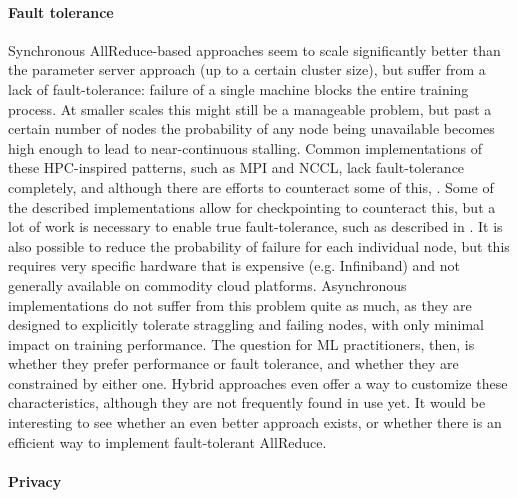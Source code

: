 \paragraph{Fault tolerance}

Synchronous AllReduce-based approaches seem to scale significantly better than the parameter server approach (up to a certain cluster size), but suffer from a lack of fault-tolerance: failure of a single machine blocks the entire training process. At smaller scales this might still be a manageable problem, but past a certain number of nodes the probability of any node being unavailable becomes high enough to lead to near-continuous stalling. Common implementations of these HPC-inspired patterns, such as MPI and NCCL, lack fault-tolerance completely, and although there are efforts to counteract some of this, . Some of the described implementations allow for checkpointing to counteract this, but a lot of work is necessary to enable true fault-tolerance, such as described in \citet{Amatya2017}. It is also possible to reduce the probability of failure for each individual node, but this requires very specific hardware that is expensive (e.g. Infiniband) and not generally available on commodity cloud platforms.
Asynchronous implementations do not suffer from this problem quite as much, as they are designed to explicitly tolerate straggling and failing nodes, with only minimal impact on training performance. The question for ML practitioners, then, is whether they prefer performance or fault tolerance, and whether they are constrained by either one. Hybrid approaches even offer a way to customize these characteristics, although they are not frequently found in use yet. It would be interesting to see whether an even better approach exists, or whether there is an efficient way to implement fault-tolerant AllReduce.

\paragraph{Privacy}

